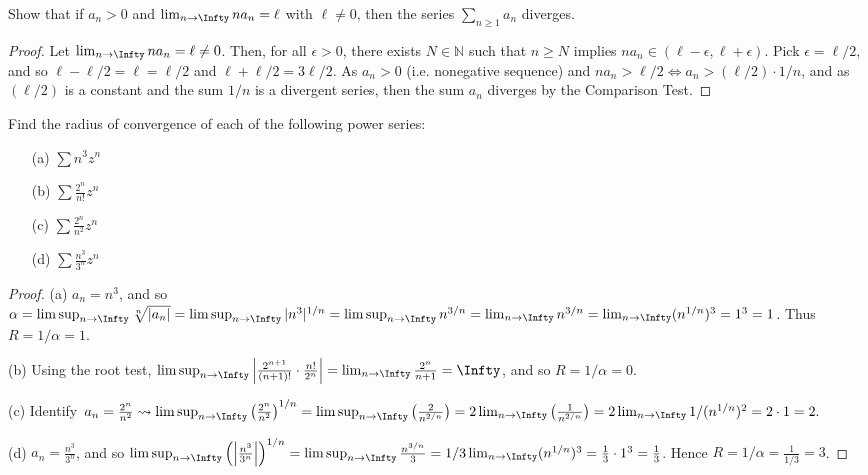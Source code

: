 \documentclass[oneside]{amsart}
\theoremstyle{definition}
\newcommand{\nn}{\mathbb N}
\begin{document}
\begin{tcolorbox}[colback=black!5!white,colframe=black!75!black,title= Exercise $4.6.$] Show that if $a_n > 0$ and $\lim_{n\to \Infty} na_n = \ell$ with $\ell \neq 0$, then the series $\sum_{n \geq 1} a_n $ diverges.
\tcblower 
\begin{proof} 
Let $\lim_{n\to \Infty} na_n = \ell \neq 0$. Then, for all $\epsilon > 0$, there exists $N \in \nn$ such that $n \geq N$ implies $na_n \in (\ell -\epsilon, \ell + \epsilon)$. Pick $\epsilon = \ell /2$, and so $\ell -\ell/2 = \ell = \ell/2$ and $\ell + \ell/2 = 3\ell /2$. As $a_n> 0$ (i.e. nonegative sequence) and $na_n > \ell /2 \Leftrightarrow a_n > (\ell/2) \cdot 1/n $, and as $(\ell/2)$ is a constant and the sum $1/n$ is a divergent series, then the sum $a_n$ diverges by the Comparison Test.
\end{proof}
\end{tcolorbox}


\begin{tcolorbox}[colback=black!5!white,colframe=black!75!black,title= Exercise $4.7.$] Find the radius of convergence of each of the following power series: 
\begin{itemize}
	\item [(a)] $\sum n^3z^n$
	\item [(b)] $\sum \frac{2^n}{n!}z^n$
	\item [(c)]$\sum \frac{2^n}{n^2}z^n$
	\item [(d)] $\sum \frac{n^3}{3^n}z^n$
\end{itemize}
\tcblower 
\begin{proof} (a) $a_n = n^3$, and so $\alpha  = \limsup_{ n \to \Infty} \sqrt[n]{|a_n|} = \limsup_{n \to \Infty} |n^3|^{1/n} = \limsup_{n \to \Infty} n^{3/n} = \lim_{n \to \Infty} n^{3/n} = \lim_{n \to \Infty} (n^{1/n})^3 = 1^3 = 1$. Thus $R = 1/\alpha = 1$.

(b) Using the root test, $\limsup_{n\to \Infty} \left | \frac{2^{n+1}}{(n+1)!} \cdot \frac{n!}{2^n}\right| = \lim_{n \to \Infty} \frac{2^n}{n+1} = \Infty$, and so $R =1/\alpha = 0$.

(c) Identify $a_n = \frac{2^n}{n^2} \rightsquigarrow \limsup_{n \to \Infty} \left ( \frac{2^n}{n^2} \right )^{1/n} = \limsup_{n \to \Infty} \left ( \frac{2}{n^{2/n}}\right ) =2 \lim_{n \to \Infty} \left (\frac{1}{n^{2/n}} \right ) = 2 \lim_{n\to \Infty} 1/(n^{1/n})^2 = 2 \cdot 1 = 2. $

(d) $a_n =  \frac{n^3}{3^n}$, and so $\limsup_{n \to \Infty} \left ( \left| \frac{n^3}{3^n}\right| \right)^{1/n} = \limsup_{n \to \Infty} \frac{n^{3/n}}{3 }  = 1/3 \lim_{n \to \Infty} (n^{1/n})^3 = \frac{1}{3} \cdot 1 ^3 = \frac{1}{3}$. Hence $R = 1/\alpha = \frac{1}{1/3} = 3$.
\end{proof}
\end{tcolorbox}
\end{document}
